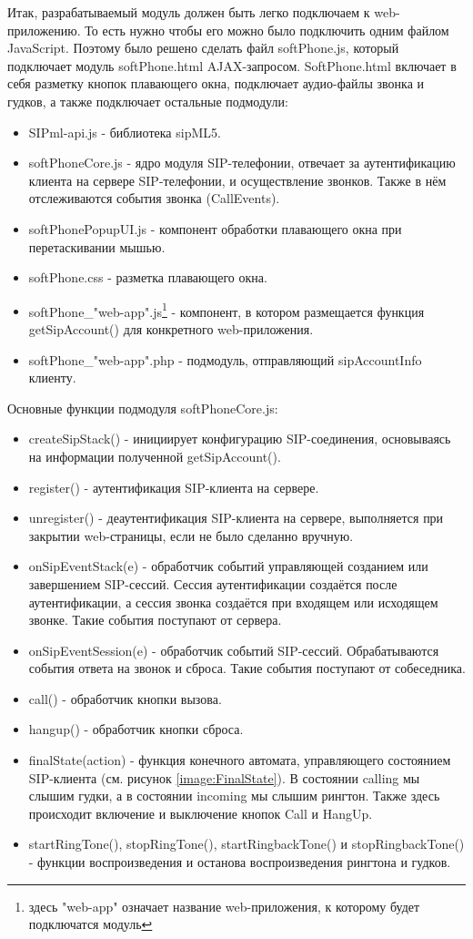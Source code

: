 Итак, разрабатываемый модуль должен быть легко подключаем к web-приложению. То есть нужно чтобы его можно было подключить одним файлом JavaScript. Поэтому было решено сделать файл softPhone.js, который подключает модуль softPhone.html AJAX-запросом. SoftPhone.html включает в себя разметку кнопок плавающего окна, подключает аудио-файлы звонка и гудков, а также подключает остальные подмодули:
\begin{itemize}
\item SIPml-api.js - библиотека sipML5.
\item softPhoneCore.js - ядро модуля SIP-телефонии, отвечает за аутентификацию клиента на сервере SIP-телефонии, и осуществление звонков. Также в нём отслеживаются события звонка (CallEvents).
\item softPhonePopupUI.js - компонент обработки плавающего окна при перетаскивании мышью.
\item softPhone.css - разметка плавающего окна.
\item softPhone\_"web-app".js\footnote{здесь "web-app" означает название web-приложения, к которому будет подключатся модуль} - компонент, в котором размещается функция getSipAccount() для конкретного web-приложения.
\item softPhone\_"web-app".php - подмодуль, отправляющий sipAccountInfo клиенту.
\end{itemize}

Основные функции подмодуля softPhoneCore.js:
\begin{itemize}
\item createSipStack() - инициирует конфигурацию SIP-соединения, основываясь на информации полученной getSipAccount().
\item register() - аутентификация SIP-клиента на сервере.
\item unregister() - деаутентификация SIP-клиента на сервере, выполняется при закрытии web-страницы, если не было сделанно вручную.
\item onSipEventStack(e) - обработчик событий управляющей созданием или завершением SIP-сессий. Сессия аутентификации создаётся после аутентификации, а сессия звонка создаётся при входящем или исходящем звонке. Такие события поступают от сервера.
\item onSipEventSession(e) - обработчик событий SIP-сессий. Обрабатываются события ответа на звонок и сброса. Такие события поступают от собеседника.
\item call() - обработчик кнопки вызова.
\item hangup() - обработчик кнопки сброса.
\item finalState(action) - функция конечного автомата, управляющего состоянием SIP-клиента (см. рисунок \ref{image:FinalState}). В состоянии calling мы слышим гудки, а в состоянии incoming мы слышим рингтон. Также здесь происходит включение и выключение кнопок Call и HangUp.
\item startRingTone(), stopRingTone(), startRingbackTone() и stopRingbackTone() - функции воспроизведения и останова воспроизведения рингтона и гудков.
\end{itemize}

